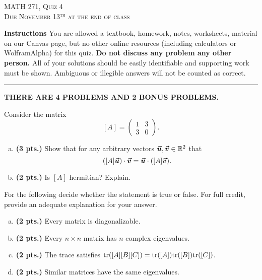 \documentclass[12pt]{amsbook}
\newcommand{\R}{\mathbb{R}}
\begin{document}

\begin{center}
   \textsc{\large MATH 271, Quiz 4}\\
   \textsc{Due November 13$^\textrm{th}$ at the end of class}
\end{center}

\vspace{1cm}

\noindent\textbf{Instructions} \; You are allowed a textbook, homework, notes, worksheets, material on our Canvas page, but no other online resources (including calculators or WolframAlpha) for this quiz.  \textbf{Do not discuss any problem any other person.} All of your solutions should be easily identifiable and supporting work must be shown.  Ambiguous or illegible answers will not be counted as correct.


\vspace*{.5cm}
\hrule
\vspace*{.5cm}

\begin{center}\textbf{\large THERE ARE 4 PROBLEMS AND 2 BONUS PROBLEMS.}\normalsize \end{center}

\begin{problem} Consider the matrix
\[
[A] = \begin{pmatrix} 1 & 3 \\ 3 & 0 \end{pmatrix}.
\]
\begin{enumerate}[(a)]
    \item \textbf{(3 pts.)} Show that for any arbitrary vectors $\vecu,\vecv \in \R^2$ that
    \[
        ([A] \boldsymbol{\boldsymbol{\vec{u}}})\cdot \boldsymbol{\boldsymbol{\vec{v}}} = \boldsymbol{\boldsymbol{\vec{u}}} \cdot ([A] \boldsymbol{\boldsymbol{\vec{v}}}).
    \]
    \item \textbf{(2 pts.)} Is $[A]$ hermitian? Explain.
\end{enumerate}
\end{problem}

\begin{problem}
For the following decide whether the statement is true or false. For full credit, provide an adequate explanation for your answer.
\begin{enumerate}[(a)]
    \item \textbf{(2 pts.)} Every matrix is diagonalizable.
    \item \textbf{(2 pts.)} Every $n\times n$ matrix has $n$ complex eigenvalues.
    \item \textbf{(2 pts.)} The trace satisfies $\mathrm{tr}([A][B][C]) = \mathrm{tr}([A])\mathrm{tr}([B])\mathrm{tr}([C])$.
    \item \textbf{(2 pts.)} Similar matrices have the same eigenvalues.
\end{enumerate}
\end{problem}
\end{document}
